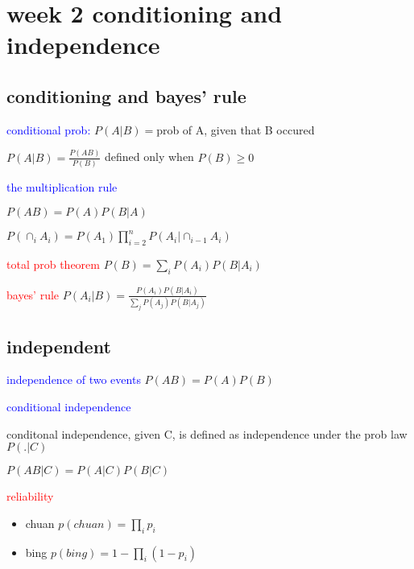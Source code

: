 \section*{week 2 conditioning and independence}

\subsection*{conditioning and bayes' rule}

\textcolor{blue}{conditional prob:}
$P(A|B)=$prob of A, given that B occured

$P(A|B)=\frac{P(AB)}{P(B)}$ defined only when $P(B)\ge 0$

\textcolor{blue}{the multiplication rule}

$P(AB)=P(A)P(B|A)$

$P(\cap_i A_i)=P(A_1)\prod_{i=2}^n P(A_i|\cap_{i-1} A_{i})$


\textcolor{red}{total prob theorem}
$P(B)=\sum_i P(A_i)P(B|A_i)$

\textcolor{red}{bayes' rule}
$P(A_i|B)=\frac{P(A_i)P(B|A_i)}{\sum_j P(A_j)P(B|A_j)}$


\subsection*{independent}

\textcolor{blue}{independence of two events}
$P(AB)=P(A)P(B)$

\textcolor{blue}{conditional independence}

conditonal independence, given C, is defined as independence under the prob law $P(.|C)$

$P(AB|C)=P(A|C)P(B|C)$

\textcolor{red}{reliability}

\begin{itemize}
    \item chuan $p(chuan)=\prod_i p_i$
    \item bing  $p(bing)=1-\prod_i(1-p_i)$
\end{itemize}